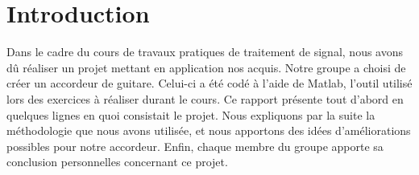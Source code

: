 \section{Introduction}
Dans le cadre du cours de travaux pratiques de traitement de signal, nous avons dû réaliser un projet mettant en application nos acquis. Notre groupe a choisi de créer un accordeur de guitare. Celui-ci a été codé à l'aide de Matlab, l'outil utilisé lors des exercices à réaliser durant le cours. Ce rapport présente tout d'abord en quelques lignes en quoi consistait le projet. Nous expliquons par la suite la méthodologie que nous avons utilisée, et nous apportons des idées d'améliorations possibles pour notre accordeur. Enfin, chaque membre du groupe apporte sa conclusion personnelles concernant ce projet.